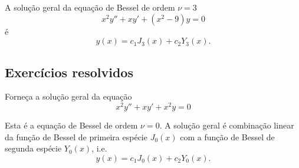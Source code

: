\begin{ex}
  A solução geral da equação de Bessel de ordem $\nu=3$
  \begin{equation}
    x^2y'' + xy' + \left(x^2 - 9\right)y = 0
  \end{equation}
  é
  \begin{equation}
    y(x) = c_1J_{3}(x) + c_2Y_3(x).
  \end{equation}  
\end{ex}

\subsection*{Exercícios resolvidos}

\begin{exeresol}
  Forneça a solução geral da equação
  \begin{equation}
    x^2y'' + xy' + x^2y = 0
  \end{equation}
\end{exeresol}
\begin{resol}
  Esta é a equação de Bessel de ordem $\nu = 0$. A solução geral é combinação linear da função de Bessel de primeira espécie $J_0(x)$ com a função de Bessel de segunda espécie $Y_0(x)$, i.e.
  \begin{equation}
    y(x) = c_1J_0(x) + c_2Y_0(x).
  \end{equation}
\end{resol}


